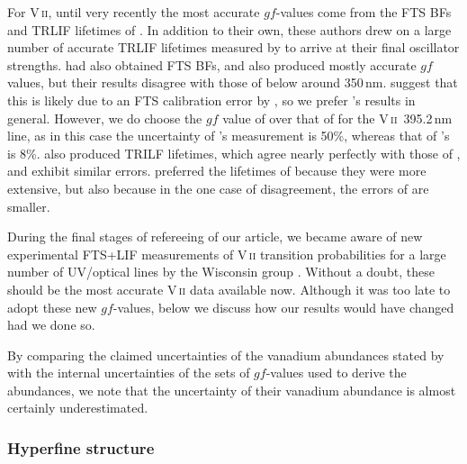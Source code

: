 \documentclass[traditabstract]{aa}
\begin{document}
For V\,\textsc{ii}, until very recently the most accurate $gf$-values come from the FTS BFs and TRLIF lifetimes of \citet{Biemont89}.  In addition
to their own, these authors drew on a large number of accurate TRLIF lifetimes measured by
\citet{Karamatskos86} to arrive at their
final oscillator strengths. 
 \citet{Karamatskos86} had also obtained FTS BFs, and also produced mostly accurate $gf$
values, but their results disagree with those of \citet{Biemont89} below around \mbox{350\,nm}.  
\citeauthor{Biemont89}
suggest that this is likely due to an FTS calibration error by \citet{Karamatskos86}, so we prefer \citeauthor{Biemont89}'s
results in general.  However, we do choose the $gf$ value of \citeauthor{Karamatskos86} over that of \citeauthor{Biemont89}
for the \mbox{V\,\textsc{ii} 395.2\,nm} line, as in this case the uncertainty of \citeauthor{Biemont89}'s measurement
is 50\%, whereas that of \citeauthor{Karamatskos86}'s is 8\%.  \citet{Schade87} also produced TRILF lifetimes, which
agree nearly perfectly with those of \citet{Karamatskos86}, and exhibit similar errors.  \citet{Biemont89} preferred
the lifetimes of \citet{Karamatskos86} because they were more extensive, but also because in the one case of disagreement,
the errors of \citeauthor{Karamatskos86} are smaller. 

During the final stages of refereeing of our article, we became aware of new experimental FTS+LIF measurements of V\,\textsc{ii} transition probabilities for a large number of UV/optical lines by the Wisconsin group \citep{Wood14V2}. Without a doubt, these should be the most accurate V\,\textsc{ii} data available now. Although it was too late to adopt these new $gf$-values, below we discuss how our results would have changed had we done so.

By comparing the claimed uncertainties of the vanadium abundances stated by \citet{Biemont89} with the internal
uncertainties of the sets of $gf$-values used to derive the abundances, we note that the uncertainty of their vanadium
abundance is almost certainly underestimated.

\subsubsection{Hyperfine structure}
\label{Vhfs}
\end{document}
